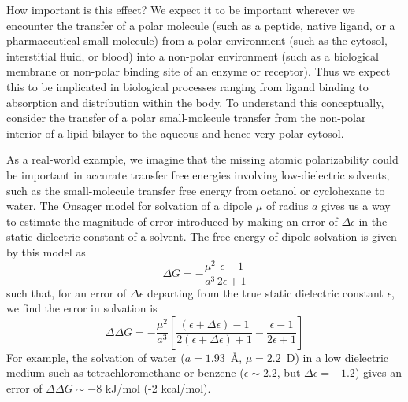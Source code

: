 \documentclass[journal=jacsat,manuscript=article]{achemso}
\begin{document}
How important is this effect?
We expect it to be important wherever we encounter the transfer of a polar molecule (such as a peptide, native ligand, or a pharmaceutical small molecule) from a polar environment (such as the cytosol, interstitial fluid, or blood) into a non-polar environment (such as a biological membrane or non-polar binding site of an enzyme or receptor). Thus we expect this to be implicated in biological processes ranging from ligand binding to absorption and distribution within the body. To understand this conceptually, consider the transfer of a polar small-molecule transfer from the non-polar interior of a lipid bilayer to the aqueous and hence very polar cytosol.

As a real-world example, we imagine that the missing atomic polarizability could be important in accurate transfer free energies involving low-dielectric solvents, such as the small-molecule transfer free energy from octanol or cyclohexane to water.  
The Onsager model for solvation of a dipole $\mu$ of radius $a$ gives us a way to estimate the magnitude of error introduced by making an error of $\Delta \epsilon$ in the static dielectric constant of a solvent.
The free energy of dipole solvation is given by this model as
\begin{equation} \label{eq:onsager}
\Delta G = -\frac{\mu^2}{a^3}\frac{\epsilon - 1}{2 \epsilon + 1}
\end{equation}
such that, for an error of $\Delta \epsilon$ departing from the true static dielectric constant $\epsilon$, we find the error in solvation is
\begin{equation} \label{equation:onsager-error}
\Delta \Delta G = -\frac{\mu^2}{a^3} \left[ \frac{(\epsilon+\Delta \epsilon) - 1}{2 (\epsilon+\Delta \epsilon) + 1} - \frac{\epsilon - 1}{2 \epsilon + 1} \right] 
\end{equation}
For example, the solvation of water ($a = 1.93$~\AA, $\mu = 2.2$~D) in a low dielectric medium such as tetrachloromethane or benzene ($\epsilon \sim 2.2$, but $\Delta \epsilon = -1.2$) gives an error of $\Delta \Delta G \sim -8$ kJ/mol (-2 kcal/mol).
\end{document}
